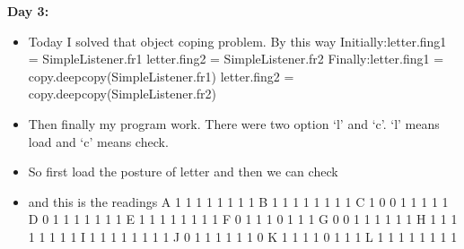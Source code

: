 \documentclass[12pt,a4paper,english]{article}
\begin{document}
		\begin{flushleft}
		\Huge{ \textbf{Day 3:}}
		\end{flushleft}
		\begin{itemize}
			\item Today I solved that object coping problem. By this way\newline
		Initially:\newline	letter.fing1 = SimpleListener.fr1\newline
		letter.fing2 = SimpleListener.fr2\newline
		Finally:\newline letter.fing1 = copy.deepcopy(SimpleListener.fr1)\newline
		letter.fing2 = copy.deepcopy(SimpleListener.fr2)
		
			\item Then finally my program work. There were two option ‘l’ and ‘c’. ‘l’ means load and ‘c’ means check.
			\item So first load the posture of letter and then we can check
			\item and this is the readings \newline
			A\hspace{0.72in}		1	1	1	1	1	1	1	1\newline
			B\hspace{0.72in}		1	1	1	1	1	1	1	1\newline
			C\hspace{0.72in}		1	0	0	1	1	1	1	1\newline
			D\hspace{0.72in}		0	1	1	1	1	1	1	1\newline
			E\hspace{0.72in}		1	1	1	1	1	1	1	1\newline
			F\hspace{0.72in}		0	1	1	1	0	1	1	1\newline
			G\hspace{0.72in}		0	0	1	1	1	1	1	1\newline
			H\hspace{0.72in}		1	1	1	1	1	1	1	1\newline
			I\hspace{0.78in}		1	1	1	1	1	1	1	1\newline
			J\hspace{0.75in}		0	1	1	1	1	1	1	0\newline
			K\hspace{0.72in}		1	1	1	1	0	1	1	1\newline
			L\hspace{0.75in}		1	1	1	1	1	1	1	1\newline

\end{itemize}
\end{document}
